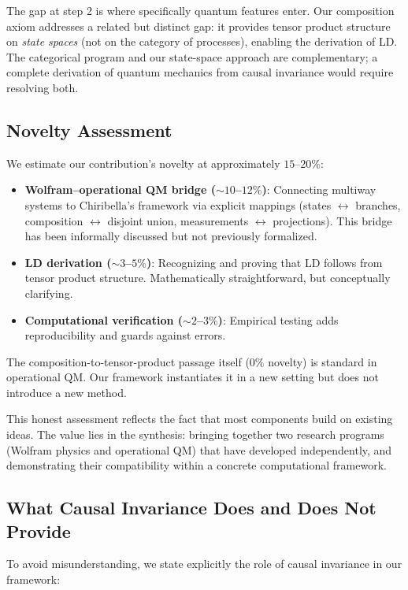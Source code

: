 \documentclass[11pt,a4paper]{article}
\theoremstyle{definition}
\theoremstyle{remark}
\begin{document}
The gap at step 2 is where specifically quantum features enter. Our
composition axiom addresses a related but distinct gap: it provides
tensor product structure on \textit{state spaces} (not on the category
of processes), enabling the derivation of LD. The categorical program
and our state-space approach are complementary; a complete derivation of
quantum mechanics from causal invariance would require resolving both.

\subsection{Novelty Assessment}

We estimate our contribution's novelty at approximately $15$--$20\%$:

\begin{itemize}
\item \textbf{Wolfram--operational QM bridge ($\sim 10$--$12\%$)}:
  Connecting multiway systems to Chiribella's framework via explicit
  mappings (states $\leftrightarrow$ branches, composition
  $\leftrightarrow$ disjoint union, measurements $\leftrightarrow$
  projections). This bridge has been informally discussed but not
  previously formalized.
\item \textbf{LD derivation ($\sim 3$--$5\%$)}: Recognizing and proving
  that LD follows from tensor product structure. Mathematically
  straightforward, but conceptually clarifying.
\item \textbf{Computational verification ($\sim 2$--$3\%$)}: Empirical
  testing adds reproducibility and guards against errors.
\end{itemize}

The composition-to-tensor-product passage itself ($0\%$ novelty) is
standard in operational QM. Our framework instantiates it in a new
setting but does not introduce a new method.

This honest assessment reflects the fact that most components build on
existing ideas. The value lies in the synthesis: bringing together two
research programs (Wolfram physics and operational QM) that have
developed independently, and demonstrating their compatibility within
a concrete computational framework.

\subsection{What Causal Invariance Does and Does Not Provide}

To avoid misunderstanding, we state explicitly the role of causal
invariance in our framework:
\end{document}
